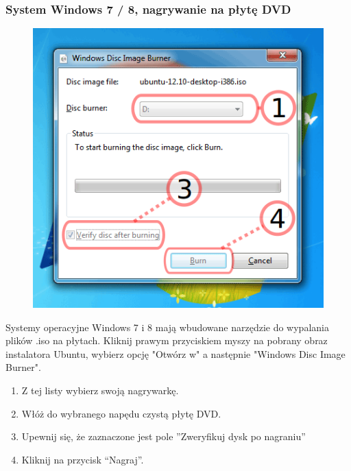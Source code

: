 \subsubsection{System Windows 7 / 8, nagrywanie na płytę DVD}
\begin{figure}
		\includegraphics[width=\linewidth]{images/instalacja_nagrywanie_obrazu_DVD.png}
\end{figure}
Systemy operacyjne Windows 7 i 8 mają wbudowane narzędzie do wypalania plików .iso na płytach. Kliknij prawym przyciskiem myszy na pobrany obraz instalatora Ubuntu, wybierz opcję "Otwórz w" a następnie "Windows Disc Image Burner".
\begin{enumerate}
\item Z tej listy wybierz swoją nagrywarkę.
\item Włóż do wybranego napędu czystą płytę DVD.
\item Upewnij się, że zaznaczone jest pole ”Zweryfikuj dysk po nagraniu”
\item Kliknij na przycisk “Nagraj”.
\end{enumerate}
\clearpage


